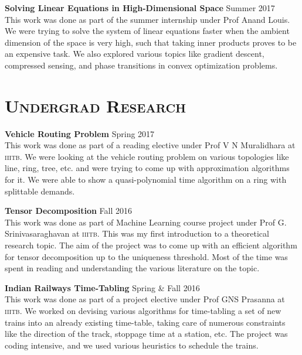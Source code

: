 \documentclass[line,margin]{res}
\begin{document}
\begin{resume}
              {\bf Solving Linear Equations in High-Dimensional Space} \hfill Summer 2017\\
              This work was done as part of the summer internship under Prof Anand Louis. We were trying to solve the system of linear equations faster when the ambient dimension of the space is very high, such that taking inner products proves to be an expensive task. We also explored various topics like gradient descent, compressed sensing, and phase transitions in convex optimization problems.

\section{\textsc{Undergrad Research}}


               {\bf Vehicle Routing Problem} \hfill Spring 2017\\
              This work was done as part of a reading elective under {Prof V N Muralidhara} at \textsc{iiitb}. We were looking at the vehicle routing problem on various topologies like line, ring, tree, etc. and were trying to come up with approximation algorithms for it. We were able to show a quasi-polynomial time algorithm on a ring with splittable demands.

              {\bf Tensor Decomposition} \hfill Fall 2016\\
              This work was done as part of Machine Learning course project under Prof G. Srinivasaraghavan at \textsc{iiitb}. This was my first introduction to a theoretical research topic. The aim of the project was to come up with an efficient algorithm for tensor decomposition up to the uniqueness threshold. Most of the time was spent in reading and understanding the various literature on the topic.

              {\bf Indian Railways Time-Tabling} \hfill Spring \& Fall 2016\\
              This work was done as part of a project elective under {Prof GNS Prasanna} at \textsc{iiitb}. We worked on devising various algorithms for time-tabling a set of new trains into an already existing time-table, taking care of numerous constraints like the direction of the track, stoppage time at a station, etc. The project was coding intensive, and we used various heuristics to schedule the trains.

\begin{itemize}

\end{itemize}
\end{resume}
\end{document}

